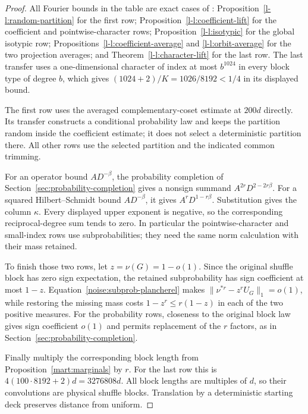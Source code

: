 \begin{proof}
All Fourier bounds in the table are exact cases of
\cite{partialFourier}: Proposition~\ref*{l-l:random-partition} for
the first row; Proposition~\ref*{l-l:coefficient-lift} for the
coefficient and pointwise-character rows; Proposition~\ref*{l-l:isotypic}
for the global isotypic row;
Propositions~\ref*{l-l:coefficient-average} and
\ref*{l-l:orbit-average} for the two projection averages; and
Theorem~\ref*{l-l:character-lift} for the last row.
The last transfer uses a one-dimensional character of index at most
$b^{1024}$ in every block type of degree $b$, which gives
$(1024+2)/K=1026/8192<1/4$ in its displayed bound.

The first row uses the averaged complementary-coset estimate at
$200d$ directly. Its transfer constructs a conditional probability
law and keeps the partition random inside the coefficient estimate;
it does not select a deterministic partition there. All other rows
use the selected partition and the indicated common trimming.

For an operator bound $A D^{-\beta}$, the probability completion of
Section~\ref{sec:probability-completion} gives a nonsign summand
$A^{2r}D^{2-2r\beta}$. For a squared Hilbert--Schmidt bound
$A D^{-\beta}$, it gives $A^rD^{1-r\beta}$. Substitution gives the
column $\kappa$. Every displayed upper exponent is negative, so the
corresponding reciprocal-degree sum tends to zero. In particular
the pointwise-character and small-index rows use subprobabilities;
they need the same norm calculation with their mass retained.

To finish those two rows, let $z=\nu(G)=1-o(1)$. Since the original
shuffle block has zero sign expectation, the retained subprobability
has sign coefficient at most $1-z$. Equation~\eqref{noise:subprob-plancherel}
makes $\|\nu^{*r}-z^rU_G\|_1=o(1)$, while restoring the missing mass
costs $1-z^r\le r(1-z)$ in each of the two positive measures.
For the probability rows, closeness to the original block law gives
sign coefficient $o(1)$ and permits replacement of the $r$ factors,
as in Section~\ref{sec:probability-completion}.

Finally multiply the corresponding block length from
Proposition~\ref{mart:marginals} by $r$. For the last row this is
$4(100\cdot8192+2)d=3276808d$. All block lengths are multiples of
$d$, so their convolutions are physical shuffle blocks. Translation
by a deterministic starting deck preserves distance from uniform.
\end{proof}

